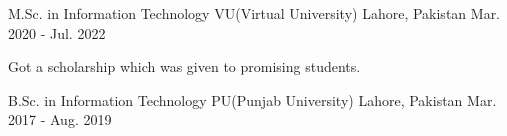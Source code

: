 
\begin{cventries}
  \cventry
    {M.Sc. in Information Technology} %
    {VU(Virtual University)} %
    {Lahore, Pakistan} %
    {Mar. 2020 - Jul. 2022} %
    {\begin{cvitems} %
        \item {Got a scholarship which was given to promising students.}
      \end{cvitems}}

  \cventry
    {B.Sc. in Information Technology} %
    {PU(Punjab University)} %
    {Lahore, Pakistan} %
    {Mar. 2017 - Aug. 2019} %
    {}



\end{cventries}
